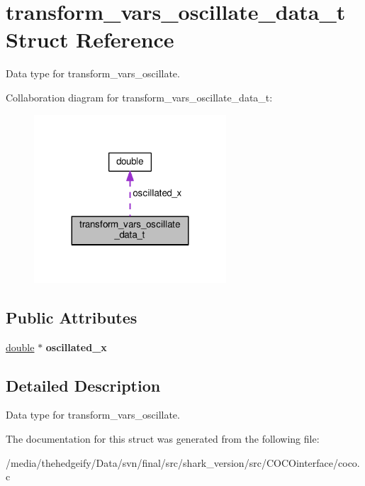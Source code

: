 \hypertarget{structtransform__vars__oscillate__data__t}{}\section{transform\+\_\+vars\+\_\+oscillate\+\_\+data\+\_\+t Struct Reference}
\label{structtransform__vars__oscillate__data__t}


Data type for transform\+\_\+vars\+\_\+oscillate.  




Collaboration diagram for transform\+\_\+vars\+\_\+oscillate\+\_\+data\+\_\+t\+:\nopagebreak
\begin{figure}[H]
\begin{center}
\leavevmode
\includegraphics[width=203pt]{structtransform__vars__oscillate__data__t__coll__graph}
\end{center}
\end{figure}
\subsection*{Public Attributes}
\begin{DoxyCompactItemize}
\item 
\hyperlink{classdouble}{double} $\ast$ {\bfseries oscillated\+\_\+x}\hypertarget{structtransform__vars__oscillate__data__t_a61169af93575959cc40536801a72777e}{}\label{structtransform__vars__oscillate__data__t_a61169af93575959cc40536801a72777e}

\end{DoxyCompactItemize}


\subsection{Detailed Description}
Data type for transform\+\_\+vars\+\_\+oscillate. 

The documentation for this struct was generated from the following file\+:\begin{DoxyCompactItemize}
\item 
/media/thehedgeify/\+Data/svn/final/src/shark\+\_\+version/src/\+C\+O\+C\+Ointerface/coco.\+c\end{DoxyCompactItemize}
